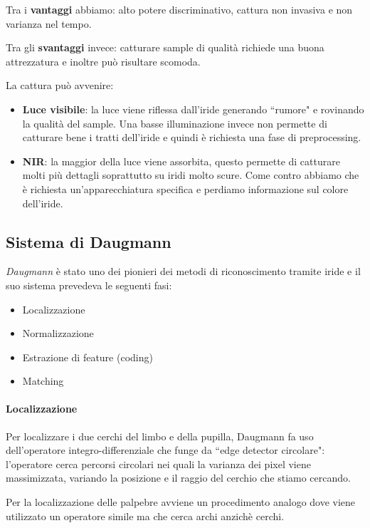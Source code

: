\documentclass{article}
\begin{document}
Tra i \textbf{vantaggi} abbiamo: alto potere discriminativo, cattura non invasiva e non varianza nel tempo.

\medskip

Tra gli \textbf{svantaggi} invece: catturare sample di qualità richiede una buona attrezzatura e inoltre può risultare scomoda.

\bigskip

La cattura può avvenire:
\begin{itemize}
    \item \textbf{Luce visibile}: la luce viene riflessa dall'iride generando ``rumore" e rovinando la qualità del sample. Una basse illuminazione invece non permette di catturare bene i tratti dell'iride e quindi è richiesta una fase di preprocessing.
    \item \textbf{NIR}: la maggior della luce viene assorbita, questo permette di catturare molti più dettagli soprattutto su iridi molto scure. Come contro abbiamo che è richiesta un'apparecchiatura specifica e perdiamo informazione sul colore dell'iride.
\end{itemize}

\subsection{Sistema di Daugmann}
\textit{Daugmann} è stato uno dei pionieri dei metodi di riconoscimento tramite iride e il suo sistema prevedeva le seguenti fasi:
\begin{itemize}
    \item Localizzazione
    \item Normalizzazione
    \item Estrazione di feature (coding)
    \item Matching
\end{itemize}

\paragraph{Localizzazione} Per localizzare i due cerchi del limbo e della pupilla, Daugmann fa uso dell'operatore integro-differenziale che funge da ``edge detector circolare": l'operatore cerca percorsi circolari nei quali la varianza dei pixel viene massimizzata, variando la posizione e il raggio del cerchio che stiamo cercando.

Per la localizzazione delle palpebre avviene un procedimento analogo dove viene utilizzato un operatore simile ma che cerca archi anzichè cerchi.
\end{document}
